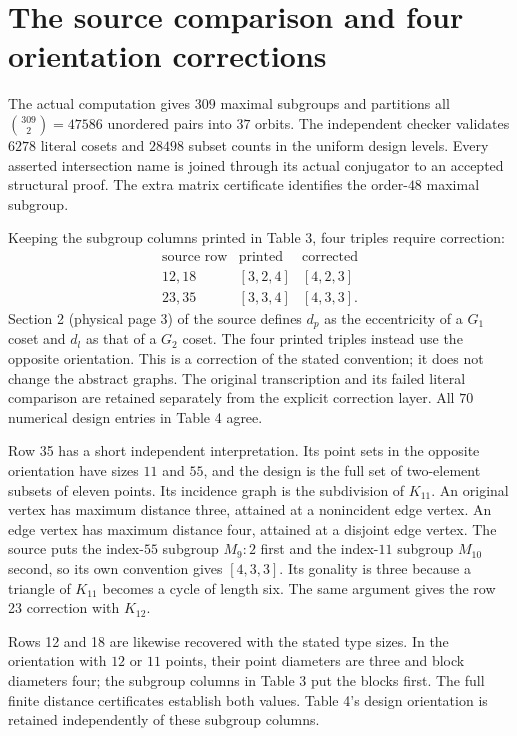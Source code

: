 \documentclass[11pt]{article}
\begin{document}
\section{The source comparison and four orientation corrections}
The actual computation gives $309$ maximal subgroups and partitions all
$\binom{309}{2}=47586$ unordered pairs into $37$ orbits. The independent
checker validates $6278$ literal cosets and $28498$ subset counts in the
uniform design levels. Every asserted intersection name is joined through
its actual conjugator to an accepted structural proof. The extra matrix
certificate identifies the order-$48$ maximal subgroup.

Keeping the subgroup columns printed in Table 3, four triples require
correction:
\[
\begin{array}{c|cc}
\text{source row}&\text{printed}&\text{corrected}\\\hline
12,18 &[3,2,4]&[4,2,3]\\
23,35 &[3,3,4]&[4,3,3].
\end{array}
\]
Section 2 (physical page 3) of the source defines $d_p$ as the eccentricity of a $G_1$ coset
and $d_l$ as that of a $G_2$ coset. The four printed triples instead use
the opposite orientation. This is a correction of the stated convention;
it does not change the abstract graphs. The original transcription and
its failed literal comparison are retained separately from the explicit
correction layer. All $70$ numerical design entries in Table 4 agree.

Row 35 has a short independent interpretation. Its point sets in the
opposite orientation have sizes $11$ and $55$, and the design is the full
set of two-element subsets of eleven points. Its incidence graph is the
subdivision of $K_{11}$. An original vertex has maximum distance three,
attained at a nonincident edge vertex. An edge vertex has maximum distance
four, attained at a disjoint edge vertex. The source puts the index-$55$
subgroup $M_9:2$ first and the index-$11$ subgroup $M_{10}$ second, so its
own convention gives $[4,3,3]$. Its gonality is three because a triangle
of $K_{11}$ becomes a cycle of length six. The same argument gives the
row 23 correction with $K_{12}$.

Rows 12 and 18 are likewise recovered with the stated type sizes. In the
orientation with $12$ or $11$ points, their point diameters are three and
block diameters four; the subgroup columns in Table 3 put the blocks first.
The full finite distance certificates establish both values. Table 4's
design orientation is retained independently of these subgroup columns.
\end{document}
